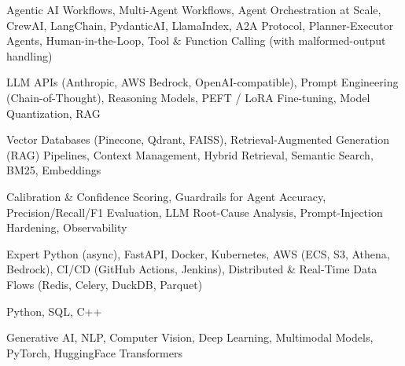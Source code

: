 \documentclass[letter,10pt]{article}
\begin{document}
 Agentic AI Workflows, Multi-Agent Workflows, Agent Orchestration at Scale, CrewAI, LangChain, PydanticAI, LlamaIndex, A2A Protocol, Planner-Executor Agents, Human-in-the-Loop, Tool \& Function Calling (with malformed-output handling)\par\vspace{2pt}

 LLM APIs (Anthropic, AWS Bedrock, OpenAI-compatible), Prompt Engineering (Chain-of-Thought), Reasoning Models, PEFT / LoRA Fine-tuning, Model Quantization, RAG\par\vspace{2pt}

 Vector Databases (Pinecone, Qdrant, FAISS), Retrieval-Augmented Generation (RAG) Pipelines, Context Management, Hybrid Retrieval, Semantic Search, BM25, Embeddings\par\vspace{2pt}

 Calibration \& Confidence Scoring, Guardrails for Agent Accuracy, Precision/Recall/F1 Evaluation, LLM Root-Cause Analysis, Prompt-Injection Hardening, Observability\par\vspace{2pt}

 Expert Python (async), FastAPI, Docker, Kubernetes, AWS (ECS, S3, Athena, Bedrock), CI/CD (GitHub Actions, Jenkins), Distributed \& Real-Time Data Flows (Redis, Celery, DuckDB, Parquet)\par\vspace{2pt}

 Python, SQL, C++\par\vspace{2pt}

 Generative AI, NLP, Computer Vision, Deep Learning, Multimodal Models, PyTorch, HuggingFace Transformers
\end{document}
